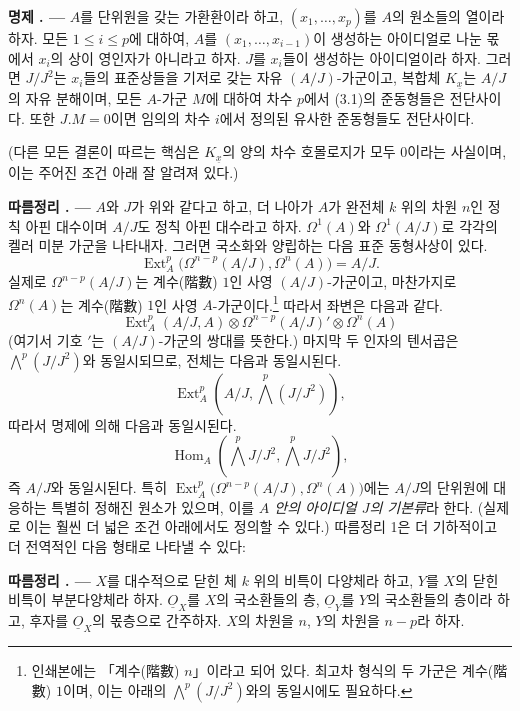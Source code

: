 \documentclass[11pt,twoside,openany]{book}
\numberwithin{equation}{section}
\newcommand{\sourceunit}{front}
\newcommand{\src}[1]{%
  \phantomsection\hypertarget{src:\sourceunit:#1}{}%
  \marginpar{\raggedleft\footnotesize\sffamily #1}%
}
\newcommand{\Osh}{\underline{O}}
\theoremstyle{plain}
\theoremstyle{definition}
\theoremstyle{remark}
\newcommand{\result}[2]{%
  \par\medskip\noindent\textbf{#1%
  \if\relax\detokenize{#2}\relax\else\space#2\fi. ---}\enspace
}
\begin{document}
\src{175}
\result{명제}{4} $A$를 단위원을 갖는 가환환이라 하고,
$(x_1,\ldots,x_p)$를 $A$의 원소들의 열이라 하자.
모든 $1\leq i\leq p$에 대하여, $A$를 $(x_1,\ldots,x_{i-1})$이 생성하는 아이디얼로 나눈 몫에서
$x_i$의 상이 영인자가 아니라고 하자. $J$를 $x_i$들이 생성하는 아이디얼이라 하자.
그러면 $J/J^{2}$는 $x_i$들의 표준상들을 기저로 갖는 자유 $(A/J)$-가군이고,
복합체 $K_{\underline{x}}$는 $A/J$의 자유 분해이며, 모든
$A$-가군 $M$에 대하여 차수 $p$에서 (3.1)의 준동형들은
전단사이다. 또한 $J.M=0$이면 임의의 차수 $i$에서 정의된 유사한
준동형들도 전단사이다.

(다른 모든 결론이 따르는 핵심은 $K_{\underline{x}}$의 양의 차수
호몰로지가 모두 $0$이라는 사실이며, 이는 주어진 조건 아래 잘 알려져 있다.)

\result{따름정리}{1} $A$와 $J$가 위와 같다고 하고, 더 나아가
$A$가 완전체 $k$ 위의 차원 $n$인 정칙 아핀 대수이며
$A/J$도 정칙 아핀 대수라고 하자. $\Omega^{1}(A)$와
$\Omega^{1}(A/J)$로 각각의 켈러 미분 가군을 나타내자. 그러면
국소화와 양립하는 다음 표준 동형사상이 있다.
\begin{equation}\tag{3.5}
  \operatorname{Ext}_{A}^{p}\bigl(\Omega^{n-p}(A/J),\Omega^{n}(A)\bigr)=A/J.
\end{equation}
실제로 $\Omega^{n-p}(A/J)$는 계수(階數) $1$인 사영 $(A/J)$-가군이고, 마찬가지로
$\Omega^{n}(A)$는 계수(階數) $1$인 사영 $A$-가군이다.\footnote{인쇄본에는
「계수(階數) $n$」이라고 되어 있다. 최고차 형식의 두 가군은 계수(階數)
$1$이며, 이는 아래의 $\bigwedge^{p}(J/J^{2})$와의 동일시에도 필요하다.}
따라서 좌변은 다음과 같다.
\[
  \operatorname{Ext}_{A}^{p}(A/J,A)
  \otimes\Omega^{n-p}(A/J)'\otimes\Omega^{n}(A)
\]
(여기서 기호 $'$는 $(A/J)$-가군의 쌍대를 뜻한다.) 마지막 두 인자의
텐서곱은 $\bigwedge^{p}(J/J^{2})$와 동일시되므로, 전체는
다음과 동일시된다.
\[
  \operatorname{Ext}_{A}^{p}\!\left(A/J,\bigwedge^{p}(J/J^{2})\right),
\]
따라서 명제에 의해 다음과 동일시된다.
\[
  \operatorname{Hom}_{A}\!\left(\bigwedge^{p}J/J^{2},
  \bigwedge^{p}J/J^{2}\right),
\]
즉 $A/J$와 동일시된다. 특히
$\operatorname{Ext}_{A}^{p}\bigl(\Omega^{n-p}(A/J),\Omega^{n}(A)\bigr)$에는
$A/J$의 단위원에 대응하는 특별히 정해진 원소가 있으며, 이를
\emph{$A$ 안의 아이디얼 $J$의 기본류}라 한다. (실제로 이는
훨씬 더 넓은 조건 아래에서도 정의할 수 있다.) 따름정리 1은
더 기하적이고 더 전역적인 다음 형태로 나타낼 수 있다:

\result{따름정리}{2} $X$를 대수적으로 닫힌 체 $k$ 위의 비특이
다양체라 하고, $Y$를 $X$의 닫힌 비특이 부분다양체라 하자.
$\Osh_X$를 $X$의 국소환들의 층, $\Osh_Y$를 $Y$의 국소환들의 층이라
하고, 후자를 $\Osh_X$의 몫층으로 간주하자. $X$의 차원을 $n$,
$Y$의 차원을 $n-p$라 하자.
\end{document}
